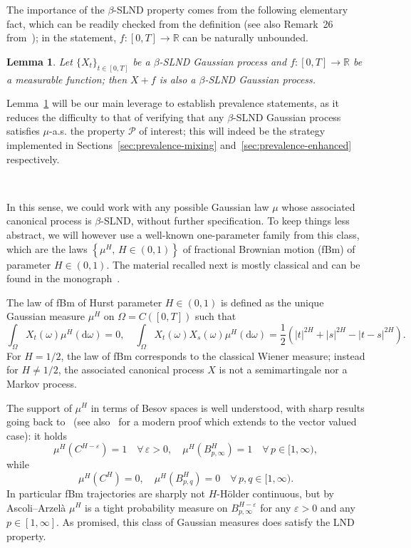 \documentclass[11pt,oneside,reqno]{amsart}
\newcommand{\mathd}{\mathrm{d}}
\newtheorem{lemma}[theorem]{Lemma}
\numberwithin{equation}{section}
\begin{document}
The importance of the $\beta$-SLND property comes from the following
elementary fact, which can be readily checked from the definition (see also
Remark~26 from~{\cite{galeati2020prevalence}}); in the statement, $f : [0, T]
\rightarrow \mathbb{R}$ can be naturally unbounded.

\begin{lemma}
  \label{lem:LND-translation}Let $\{ X_t \}_{t \in [0, T]}$ be a $\beta$-SLND
  Gaussian process and $f : [0, T] \rightarrow \mathbb{R}$ be a measurable
  function; then $X + f$ is also a $\beta$-SLND Gaussian process.
\end{lemma}

Lemma~\ref{lem:LND-translation} will be our main leverage to establish
prevalence statements, as it reduces the difficulty to that of verifying that
any $\beta$-SLND Gaussian process satisfies $\mu$-a.s. the property
$\mathcal{P}$ of interest; this will indeed be the strategy implemented in
Sections~\ref{sec:prevalence-mixing} and~\ref{sec:prevalence-enhanced}
respectively.

\

In this sense, we could work with any possible Gaussian law $\mu$ whose
associated canonical process is $\beta$-SLND, without further specification.
To keep things less abstract, we will however use a well-known one-parameter
family from this class, which are the laws $\left\{ \mu^H, \, H \in (0, 1)
\right\}$ of fractional Brownian motion (fBm) of parameter $H \in (0, 1)$. The
material recalled next is mostly classical and can be found in the
monograph~{\cite{nualart}}.

The law of fBm of Hurst parameter $H \in (0, 1)$ is defined as the unique
Gaussian measure $\mu^H$ on $\Omega = C ([0, T])$ such that
\[ \int_{\Omega} X_t (\omega) \mu^H (\mathd \omega) = 0, \quad \int_{\Omega}
   X_t (\omega) X_s (\omega) \mu^H (\mathd \omega) = \frac{1}{2} (| t |^{2 H}
   + | s |^{2 H} - | t - s |^{2 H}) . \]
For $H = 1 / 2$, the law of fBm corresponds to the classical Wiener measure;
instead for $H \neq 1 / 2$, the associated canonical process $X$ is not a
semimartingale nor a Markov process.

The support of $\mu^H$ in terms of Besov spaces is well understood, with sharp
results going back to~{\cite{ciesielski1993}} (see also~{\cite{veraar2009}}
for a modern proof which extends to the vector valued case): it holds
\[ \mu^H (C^{H - \varepsilon}) = 1 \quad \forall \, \varepsilon > 0, \quad
   \mu^H (B^H_{p, \infty}) = 1 \quad \forall \, p \in [1, \infty), \]
while
\[ \mu^H (C^H) = 0, \quad \mu^H (B^H_{p, q}) = 0 \quad \forall \, p, q \in [1,
   \infty) . \]
In particular fBm trajectories are sharply not $H$-H\"{o}lder continuous, but
by Ascoli--Arzel{\`a} $\mu^H$ is a tight probability measure on $B^{H -
\varepsilon}_{p, \infty}$ for any $\varepsilon > 0$ and any $p \in [1,
\infty]$. As promised, this class of Gaussian measures does satisfy the LND
property.
\end{document}
